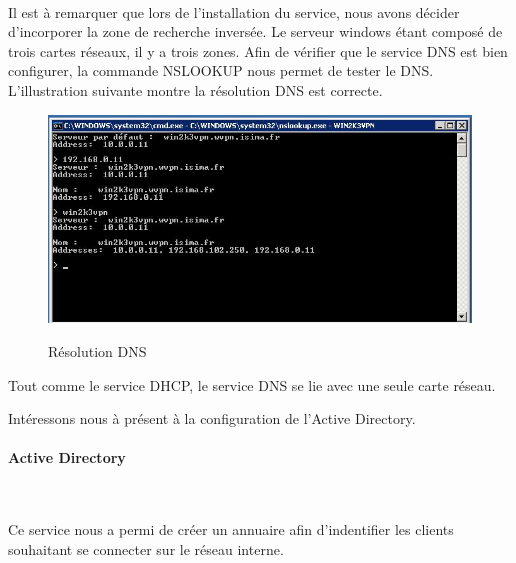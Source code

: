~\

Il est à remarquer que lors de l'installation du service, nous avons décider d'incorporer la zone de recherche inversée. Le serveur windows étant composé de trois cartes réseaux, il y a trois zones. Afin de vérifier que le service DNS est bien configurer, la commande NSLOOKUP nous permet de tester le DNS. 
L'illustration suivante montre la résolution DNS est correcte.

\begin{figure}[H]
	\begin{center}
		\includegraphics[width=\textwidth]{partie_2/screen_windows/nslookup.JPG}\\
	\end{center}
	\caption{Résolution DNS}
	\label{NSLOOKUP}
\end{figure}

Tout comme le service DHCP, le service DNS se lie avec une seule carte réseau. 

Intéressons nous à présent à la configuration de l'Active Directory.

\paragraph{Active Directory}
~\

Ce service nous a permi de créer un annuaire afin d'indentifier les clients souhaitant se connecter sur le réseau interne.